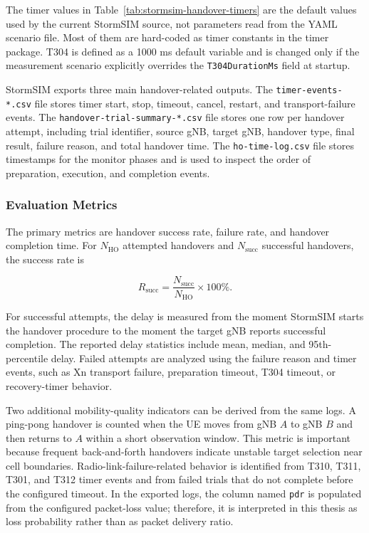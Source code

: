 The timer values in Table~\ref{tab:stormsim-handover-timers} are the default values used by the current StormSIM source, not parameters read from the YAML scenario file. Most of them are hard-coded as timer constants in the timer package. T304 is defined as a 1000 ms default variable and is changed only if the measurement scenario explicitly overrides the \texttt{T304DurationMs} field at startup.

StormSIM exports three main handover-related outputs. The
\texttt{timer-events-*.csv} file stores timer start, stop, timeout, cancel,
restart, and transport-failure events. The
\texttt{handover-trial-summary-*.csv} file stores one row per handover attempt,
including trial identifier, source gNB, target gNB, handover type, final
result, failure reason, and total handover time. The \texttt{ho-time-log.csv}
file stores timestamps for the monitor phases and is used to inspect the order
of preparation, execution, and completion events.

\subsubsection{Evaluation Metrics}

The primary metrics are handover success rate, failure rate, and handover
completion time. For \(N_{\mathrm{HO}}\) attempted handovers and
\(N_{\mathrm{succ}}\) successful handovers, the success rate is

\begin{equation}
R_{\mathrm{succ}}=\frac{N_{\mathrm{succ}}}{N_{\mathrm{HO}}}\times100\%.
\end{equation}

For successful attempts, the delay is measured from the moment StormSIM starts
the handover procedure to the moment the target gNB reports successful
completion. The reported delay statistics include mean, median, and
95th-percentile delay. Failed attempts are analyzed using the failure reason
and timer events, such as Xn transport failure, preparation timeout, T304
timeout, or recovery-timer behavior.

Two additional mobility-quality indicators can be derived from the same logs.
A ping-pong handover is counted when the UE moves from gNB \(A\) to gNB \(B\)
and then returns to \(A\) within a short observation window. This metric is
important because frequent back-and-forth handovers indicate unstable target
selection near cell boundaries. Radio-link-failure-related behavior is
identified from T310, T311, T301, and T312 timer events and from failed trials
that do not complete before the configured timeout. In the exported logs, the
column named \texttt{pdr} is populated from the configured packet-loss value;
therefore, it is interpreted in this thesis as loss probability rather than as
packet delivery ratio.


